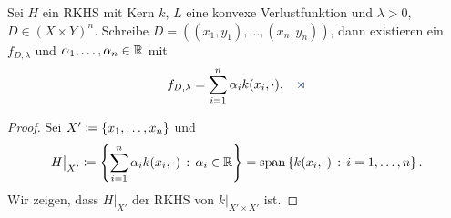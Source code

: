 \begin{prop}
\label{prop:6.1.5}
Sei $H$ ein RKHS mit Kern $k$, $L$ eine konvexe Verlustfunktion und $\lambda >
0$, $D\in (X\times Y)^n$. Schreibe $D=((x_1,y_1),\ldots,(x_n,y_n))$, dann
existieren ein $f_{D,\lambda}$ und $\alpha_1,\ldots,\alpha_n\in\mathbb{R}$ mit
\begin{align*}
f_{D,\lambda} = \sum_{i=1}^n \alpha_i k(x_i,\cdot).\fishhere
\end{align*}
\end{prop}

\begin{proof}
Sei $X'\coloneq\left\{ x_1,\ldots,x_n \right\}$ und
\begin{align*}
H\big|_{X'} \coloneq \left\{ \sum_{i=1}^n \alpha_i k(x_i,\cdot)\,:\,\alpha_i\in\mathbb{R}\right\} =
\mathrm{span} \left\{ k(x_i,\cdot)\,:\,i=1,\ldots,n\right\}.
\end{align*}
Wir zeigen, dass $H\big|_{X'}$ der RKHS von $k\big|_{X'\times X'}$ ist.


\end{proof}
